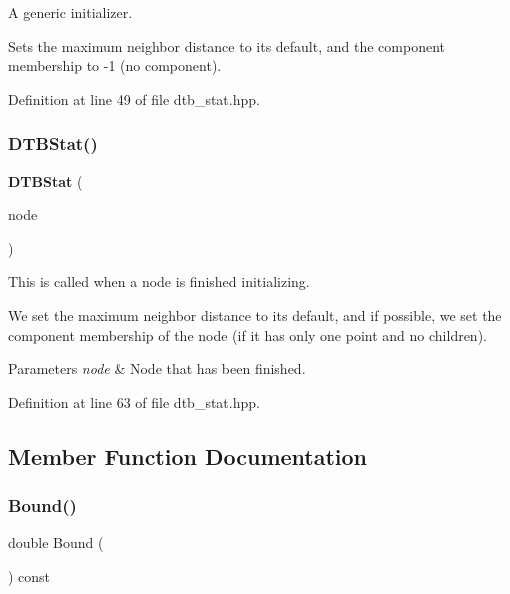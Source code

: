 A generic initializer. 

Sets the maximum neighbor distance to its default, and the component membership to -\/1 (no component). 

Definition at line 49 of file dtb\+\_\+stat.\+hpp.

\mbox{\label{classmlpack_1_1emst_1_1DTBStat_a53418f29d577baf63a854464390e8170}} 
\subsubsection{D\+T\+B\+Stat()\hspace{0.1cm}{\footnotesize\ttfamily [2/2]}}
{\footnotesize\ttfamily \textbf{ D\+T\+B\+Stat} (\begin{DoxyParamCaption}\item[{const Tree\+Type \&}]{node }\end{DoxyParamCaption})\hspace{0.3cm}{\ttfamily [inline]}}



This is called when a node is finished initializing. 

We set the maximum neighbor distance to its default, and if possible, we set the component membership of the node (if it has only one point and no children).


\begin{DoxyParams}{Parameters}
{\em node} & Node that has been finished. \\
\hline
\end{DoxyParams}


Definition at line 63 of file dtb\+\_\+stat.\+hpp.



\subsection{Member Function Documentation}
\mbox{\label{classmlpack_1_1emst_1_1DTBStat_abe1eb75f967ca19571a77a1e90faa0ad}} 
\subsubsection{Bound()\hspace{0.1cm}{\footnotesize\ttfamily [1/2]}}
{\footnotesize\ttfamily double Bound (\begin{DoxyParamCaption}{ }\end{DoxyParamCaption}) const\hspace{0.3cm}{\ttfamily [inline]}}



